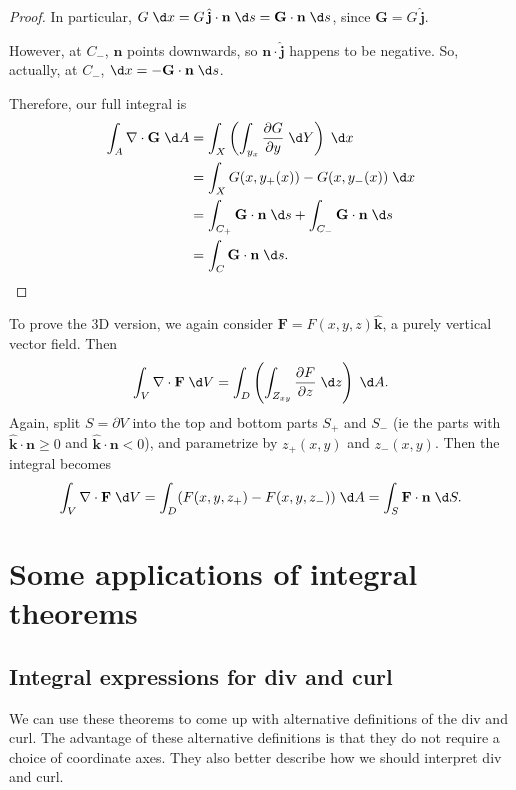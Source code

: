 \documentclass[a4paper]{article}
\begin{document}
\begin{proof}
  In particular, $G\;\d x = G\,\hat{\mathbf{j}}\cdot \mathbf{n}\;\d s = \mathbf{G}\cdot \mathbf{n}\;\d s$, since $\mathbf{G} = G\,\hat{\mathbf{j}}$.

  However, at $C_-$, $\mathbf{n}$ points downwards, so $\mathbf{n}\cdot \hat{\mathbf{j}}$ happens to be negative. So, actually, at $C_-$, $\d x = -\mathbf{G}\cdot \mathbf{n}\;\d s$.

  Therefore, our full integral is
  \begin{align*}
    \int_A \nabla\cdot \mathbf{G}\;\d A &= \int_X \left(\int_{y_x}\frac{\partial G}{\partial y}\;\d Y\right)\;\d x\\
    &= \int_X G(x, y_+(x)) - G(x, y_{-}(x))\;\d x\\
    &= \int_{C_+}\mathbf{G}\cdot \mathbf{n}\;\d s + \int_{C_-}\mathbf{G}\cdot \mathbf{n}\;\d s\\
    &= \int_C \mathbf{G}\cdot \mathbf{n}\;\d s.\qedhere
  \end{align*}
\end{proof}

To prove the 3D version, we again consider $\mathbf{F} = F(x, y, z)\hat{\mathbf{k}}$, a purely vertical vector field. Then
\[
  \int_V \nabla\cdot \mathbf{F}\;\d V = \int_D \left(\int_{Z_{xy}} \frac{\partial F}{\partial z}\;\d z\right)\;\d A.
\]
Again, split $S = \partial V$ into the top and bottom parts $S_+$ and $S_-$ (ie the parts with $\hat{\mathbf{k}}\cdot \mathbf{n} \geq 0$ and $\hat{\mathbf{k}}\cdot \mathbf{n} < 0$), and parametrize by $z_+(x, y)$ and $z_-(x, y)$. Then the integral becomes
\[
  \int_V \nabla\cdot \mathbf{F}\;\d V = \int_D (F(x, y, z_+) - F(x, y, z_-))\;\d A = \int_S \mathbf{F}\cdot \mathbf{n}\;\d S.
\]
\section{Some applications of integral theorems}
\subsection{Integral expressions for div and curl}
We can use these theorems to come up with alternative definitions of the div and curl. The advantage of these alternative definitions is that they do not require a choice of coordinate axes. They also better describe how we should interpret div and curl.
\end{document}
